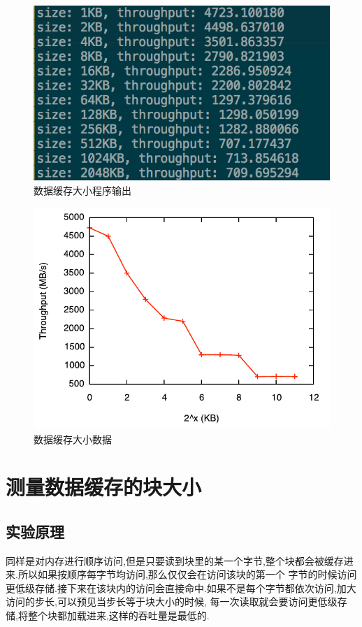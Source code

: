 \documentclass[adobefonts, nocap]{ctexart}
\begin{document}
      \begin{figure}[htbp]
        \includegraphics[width=12cm]{1.png}
        \caption{数据缓存大小程序输出}
        \label{fig1}
      \end{figure}

      \begin{figure}[htbp]
        \includegraphics[width=12cm]{2.pdf}
        \caption{数据缓存大小数据}
        \label{fig2}
      \end{figure}
      \clearpage
  \section{测量数据缓存的块大小}
    \subsection{实验原理}
      同样是对内存进行顺序访问,但是只要读到块里的某一个字节,整个块都会被缓存进来.所以如果按顺序每字节均访问,那么仅仅会在访问该块的第一个
      字节的时候访问更低级存储.接下来在该块内的访问会直接命中.如果不是每个字节都依次访问,加大访问的步长,可以预见当步长等于块大小的时候,
      每一次读取就会要访问更低级存储,将整个块都加载进来,这样的吞吐量是最低的.
\end{document}
